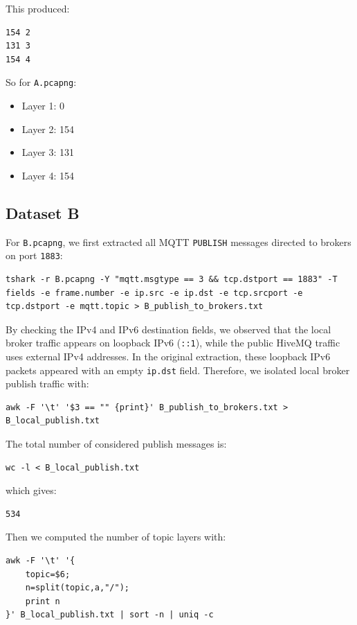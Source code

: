 This produced:

\begin{verbatim}
154 2
131 3
154 4
\end{verbatim}

So for \texttt{A.pcapng}:
\begin{itemize}
    \item Layer 1: 0
    \item Layer 2: 154
    \item Layer 3: 131
    \item Layer 4: 154
\end{itemize}

\subsection*{Dataset B}

For \texttt{B.pcapng}, we first extracted all MQTT \texttt{PUBLISH} messages directed to brokers on port \texttt{1883}:

\begin{lstlisting}
tshark -r B.pcapng -Y "mqtt.msgtype == 3 && tcp.dstport == 1883" -T fields -e frame.number -e ip.src -e ip.dst -e tcp.srcport -e tcp.dstport -e mqtt.topic > B_publish_to_brokers.txt
\end{lstlisting}

By checking the IPv4 and IPv6 destination fields, we observed that the local broker traffic appears on loopback IPv6 (\texttt{::1}), while the public HiveMQ traffic uses external IPv4 addresses. In the original extraction, these loopback IPv6 packets appeared with an empty \texttt{ip.dst} field. Therefore, we isolated local broker publish traffic with:

\begin{lstlisting}
awk -F '\t' '$3 == "" {print}' B_publish_to_brokers.txt > B_local_publish.txt
\end{lstlisting}

The total number of considered publish messages is:

\begin{lstlisting}
wc -l < B_local_publish.txt
\end{lstlisting}

which gives:

\begin{verbatim}
534
\end{verbatim}

Then we computed the number of topic layers with:

\begin{lstlisting}
awk -F '\t' '{
    topic=$6;
    n=split(topic,a,"/");
    print n
}' B_local_publish.txt | sort -n | uniq -c
\end{lstlisting}

